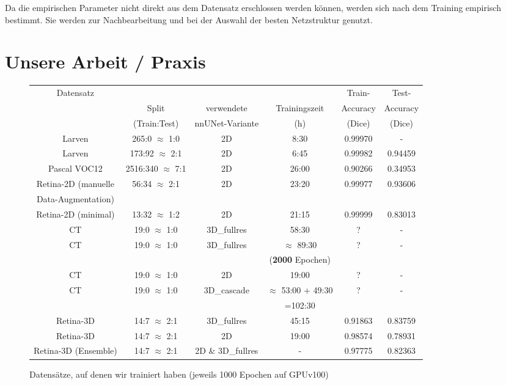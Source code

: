 Da die empirischen Parameter nicht direkt aus dem Datensatz erschlossen werden können, werden sich nach dem Training empirisch bestimmt. Sie werden zur Nachbearbeitung und bei der Auswahl der besten Netzstruktur genutzt. 


\section{Unsere Arbeit / Praxis}
\begin{figure}[H]
\begin{tabular}{|c|c|c|c|c|c|}
\hline 
\multirow{3}{*}{Datensatz} &  &  & & Train-& Test- \\ 
 & Split & verwendete & Trainingszeit & Accuracy& Accuracy \\ 
 & (Train:Test) & nnUNet-Variante & (h) & (Dice)& (Dice)  \\ 
\hline 
Larven & 265:0 $\approx$ 1:0 & 2D & 8:30 & 0.99970 & - \\ 
\hline 
Larven & 173:92 $\approx$ 2:1 & 2D & 6:45 & 0.99982 & 0.94459 \\ 
\hline 
Pascal VOC12 & 2516:340 $\approx$ 7:1 & 2D & 26:00 & 0.90266 & 0.34953 \\ 
\hline 
Retina-2D (manuelle & \multirow{2}{*}{56:34 $\approx$ 2:1} & \multirow{2}{*}{2D} & \multirow{2}{*}{23:20} & \multirow{2}{*}{0.99977} &\multirow{2}{*}{0.93606}  \\ 
Data-Augmentation)&  & & & &  \\ 
\hline 
Retina-2D (minimal) & 13:32 $\approx$ 1:2 & 2D & 21:15 & 0.99999 &  0.83013 \\ 
\hline 
CT & 19:0 $\approx$ 1:0 & 3D\_fullres & 58:30  & ? & - \\ 

\hline 
\multirow{2}{*}{CT} & \multirow{2}{*}{19:0 $\approx$ 1:0} & \multirow{2}{*}{3D\_fullres} & $\approx$ 89:30  & \multirow{2}{*}{?} & \multirow{2}{*}{-} \\ 
 &  &  & (\textbf{2000} Epochen) &  &  \\ 
\hline 
CT & 19:0 $\approx$ 1:0 & 2D & 19:00 & ? & - \\ 
\hline 
\multirow{2}{*}{CT} & \multirow{2}{*}{19:0 $\approx$ 1:0} & \multirow{2}{*}{3D\_cascade} & $\approx$ 53:00 + 49:30 & \multirow{2}{*}{?} & \multirow{2}{*}{-} \\ 
 &  &  & =102:30 &  & \\ 
\hline 
Retina-3D & 14:7 $\approx$ 2:1 & 3D\_fullres & 45:15 & 0.91863 & 0.83759 \\ 
\hline 
Retina-3D & 14:7 $\approx$ 2:1  & 2D & 19:00 & 0.98574 & 0.78931 \\ 
\hline 
Retina-3D (Ensemble) & 14:7 $\approx$ 2:1 & 2D \& 3D\_fullres & - & 0.97775 & 0.82363 \\ 
\hline
\end{tabular} 
\caption{Datensätze, auf denen wir trainiert haben (jeweils 1000 Epochen auf GPUv100)}
\label{tab:Training}
\end{figure}

